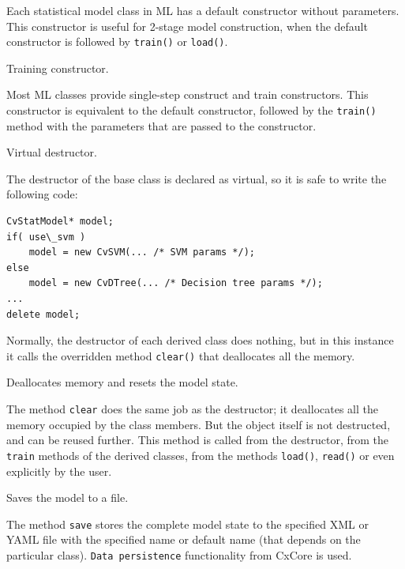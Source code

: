 
Each statistical model class in ML has a default constructor without parameters. This constructor is useful for 2-stage model construction, when the default constructor is followed by \texttt{train()} or \texttt{load()}.


Training constructor.


Most ML classes provide single-step construct and train constructors. This constructor is equivalent to the default constructor, followed by the \texttt{train()} method with the parameters that are passed to the constructor.


Virtual destructor.


The destructor of the base class is declared as virtual, so it is safe to write the following code:

\begin{lstlisting}
CvStatModel* model;
if( use\_svm )
    model = new CvSVM(... /* SVM params */);
else
    model = new CvDTree(... /* Decision tree params */);
...
delete model;
\end{lstlisting}

Normally, the destructor of each derived class does nothing, but in this instance it calls the overridden method \texttt{clear()} that deallocates all the memory.


Deallocates memory and resets the model state.


The method \texttt{clear} does the same job as the destructor; it deallocates all the memory occupied by the class members. But the object itself is not destructed, and can be reused further. This method is called from the destructor, from the \texttt{train} methods of the derived classes, from the methods \texttt{load()}, \texttt{read()} or even explicitly by the user.


Saves the model to a file.


The method \texttt{save} stores the complete model state to the specified XML or YAML file with the specified name or default name (that depends on the particular class). \texttt{Data persistence} functionality from CxCore is used.


